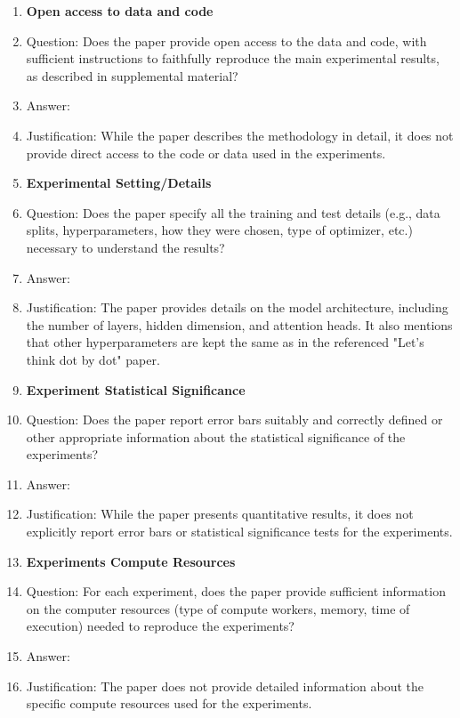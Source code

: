 \documentclass{article}
\begin{document}
\begin{enumerate}
\item {\bf Open access to data and code}
    \item[] Question: Does the paper provide open access to the data and code, with sufficient instructions to faithfully reproduce the main experimental results, as described in supplemental material?
    \item[] Answer: \answerYes{} 
    \item[] Justification: While the paper describes the methodology in detail, it does not provide direct access to the code or data used in the experiments.

\item {\bf Experimental Setting/Details}
    \item[] Question: Does the paper specify all the training and test details (e.g., data splits, hyperparameters, how they were chosen, type of optimizer, etc.) necessary to understand the results?
    \item[] Answer: \answerYes{} 
    \item[] Justification: The paper provides details on the model architecture, including the number of layers, hidden dimension, and attention heads. It also mentions that other hyperparameters are kept the same as in the referenced "Let's think dot by dot" paper.

\item {\bf Experiment Statistical Significance}
    \item[] Question: Does the paper report error bars suitably and correctly defined or other appropriate information about the statistical significance of the experiments?
    \item[] Answer: \answerNo{} 
    \item[] Justification: While the paper presents quantitative results, it does not explicitly report error bars or statistical significance tests for the experiments.

\item {\bf Experiments Compute Resources}
    \item[] Question: For each experiment, does the paper provide sufficient information on the computer resources (type of compute workers, memory, time of execution) needed to reproduce the experiments?
    \item[] Answer: \answerNo{} 
    \item[] Justification: The paper does not provide detailed information about the specific compute resources used for the experiments.


\end{enumerate}
\end{document}
